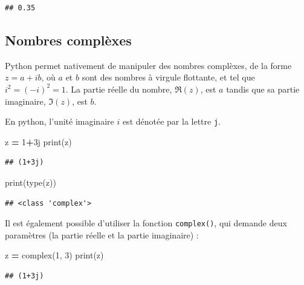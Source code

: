 \documentclass[12pt,]{book}
\newenvironment{Shaded}{\begin{snugshade}}{\end{snugshade}}
\newcommand{\DecValTok}[1]{\textcolor[rgb]{0.00,0.00,0.81}{#1}}
\newcommand{\OperatorTok}[1]{\textcolor[rgb]{0.81,0.36,0.00}{\textbf{#1}}}
\newcommand{\BuiltInTok}[1]{#1}
\newcommand{\NormalTok}[1]{#1}
\numberwithin{equation}{section}
\numberwithin{countremarque}{section}
\begin{document}
\begin{lstlisting}
## 0.35
\end{lstlisting}

\subsection{Nombres complèxes}\label{nombres-complexes}

Python permet nativement de manipuler des nombres complèxes, de la forme
\(z=a+ib\), où \(a\) et \(b\) sont des nombres à virgule flottante, et
tel que \(i^2=(-i)^2=1\). La partie réelle du nombre,
\(\mathfrak{R}(z)\), est \(a\) tandis que sa partie imaginaire,
\(\mathfrak{I}(z)\), est \(b\).

En python, l'unité imaginaire \(i\) est dénotée par la lettre
\texttt{j}.

\begin{Shaded}
\begin{Highlighting}[]
\NormalTok{z }\OperatorTok{=} \DecValTok{1}\OperatorTok{+}\NormalTok{3j}
\BuiltInTok{print}\NormalTok{(z)}
\end{Highlighting}
\end{Shaded}

\begin{lstlisting}
## (1+3j)
\end{lstlisting}

\begin{Shaded}
\begin{Highlighting}[]
\BuiltInTok{print}\NormalTok{(}\BuiltInTok{type}\NormalTok{(z))}
\end{Highlighting}
\end{Shaded}

\begin{lstlisting}
## <class 'complex'>
\end{lstlisting}

Il est également possible d'utiliser la fonction \texttt{complex()}, qui
demande deux paramètres (la partie réelle et la partie imaginaire) :

\begin{Shaded}
\begin{Highlighting}[]
\NormalTok{z }\OperatorTok{=} \BuiltInTok{complex}\NormalTok{(}\DecValTok{1}\NormalTok{, }\DecValTok{3}\NormalTok{)}
\BuiltInTok{print}\NormalTok{(z)}
\end{Highlighting}
\end{Shaded}

\begin{lstlisting}
## (1+3j)
\end{lstlisting}
\end{document}
